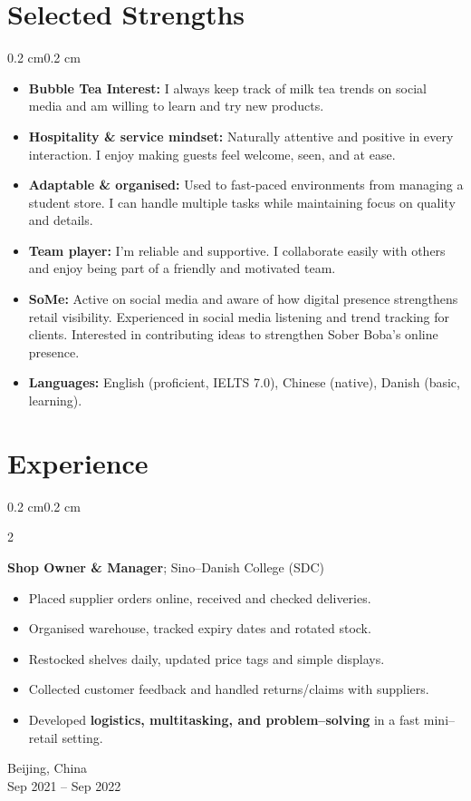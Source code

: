 \documentclass[10pt, letterpaper]{article}
\newenvironment{highlights}{
    \begin{itemize}[
        topsep=0.08 cm,
        parsep=0.08 cm,
        partopsep=0pt,
        itemsep=0pt,
        leftmargin=0.4 cm + 10pt
    ]
}{
    \end{itemize}
}
\newenvironment{onecolentry}{
    \begin{adjustwidth}{0.2 cm}{0.2 cm}
}{
    \end{adjustwidth}
}
\newenvironment{twocolentry}[2][]{
    \onecolentry
    \def\secondColumn{#2}
    \setcolumnwidth{\fill, 4.5 cm}
    \begin{paracol}{2}
}{
    \switchcolumn \raggedleft \secondColumn
    \end{paracol}
    \endonecolentry
}
\begin{document}
    \section{Selected Strengths}
    \begin{onecolentry}
        \begin{highlights}
    \item \textbf{Bubble Tea Interest:} I always keep track of milk tea trends on social media and am willing to learn and try new products.
    \item \textbf{Hospitality \& service mindset:} Naturally attentive and positive in every interaction. I enjoy making guests feel welcome, seen, and at ease.
    \item \textbf{Adaptable \& organised:} Used to fast-paced environments from managing a student store. I can handle multiple tasks while maintaining focus on quality and details.
    \item \textbf{Team player:} I'm reliable and supportive. I collaborate easily with others and enjoy being part of a friendly and motivated team.
    \item \textbf{SoMe:} Active on social media and aware of how digital presence strengthens retail visibility. Experienced in social media listening and trend tracking for clients. Interested in contributing ideas to strengthen Sober Boba’s online presence.
    \item \textbf{Languages:} English (proficient, IELTS 7.0), Chinese (native), Danish (basic, learning).
\end{highlights}
    \end{onecolentry}

    \section{Experience}

    \begin{twocolentry}{
        Beijing, China\\
        Sep 2021 -- Sep 2022
    }
        \textbf{Shop Owner \& Manager}; Sino–Danish College (SDC)
        \begin{highlights}
            \item Placed supplier orders online, received and checked deliveries.
            \item Organised warehouse, tracked expiry dates and rotated stock.
            \item Restocked shelves daily, updated price tags and simple displays.
            \item Collected customer feedback and handled returns/claims with suppliers.
            \item Developed \textbf{logistics, multitasking, and problem–solving} in a fast mini–retail setting.
        \end{highlights}
    \end{twocolentry}
\end{document}
